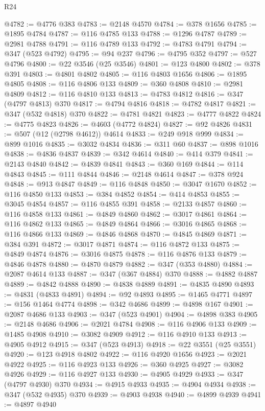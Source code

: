 \begin{lexlean}{R24}
\begin{coremodule}
@4782 := @4776 @383
@4783 := @2148 @4570
@4784 := @378 @1656
@4785 := @1895 @4784
@4787 := @116 @4785 @133
@4788 := @1296 @4787
@4789 := @2981 @4788
@4791 := @116 @4789 @133
@4792 := @4783 @4791
@4794 := @347 (@523 @4792)
@4795 := @94 @237
@4796 := @4795 @352
@4797 := @527 @4796
@4800 := @22 @3546 (@25 @3546)
@4801 := @123 @4800
@4802 := @378 @391
@4803 := @4801 @4802
@4805 := @116 @4803 @1656
@4806 := @1895 @4805
@4808 := @116 @4806 @133
@4809 := @360 @4808
@4810 := @2981 @4809
@4812 := @116 @4810 @133
@4813 := @4783 @4812
@4816 := @347 (@4797 @4813) @370
@4817 := @4794 @4816
@4818 := @4782 @4817
@4821 := @347 (@532 @4818) @370
@4822 := @4781 @4821
@4823 := @4777 @4822
@4824 := @4775 @4823
@4826 := @4603 (@4772 @4824)
@4827 := @92 @4826
@4831 := @507 (@12 (@2798 @4612)) @4614
@4833 := @249 @918 @999
@4834 := @899 @1016
@4835 := @3032 @4834
@4836 := @311 @60
@4837 := @898 @1016
@4838 := @4836 @4837
@4839 := @342 @4614
@4840 := @414 @379
@4841 := @2143 @4840
@4842 := @4839 @4841
@4843 := @360 @169
@4844 := @114 @4843
@4845 := @111 @4844
@4846 := @2148 @4614
@4847 := @378 @924
@4848 := @913 @4847
@4849 := @116 @4848
@4850 := @3047 @1670
@4852 := @116 @4850 @133
@4853 := @384 @4852
@4854 := @414 @4853
@4855 := @3045 @4854
@4857 := @116 @4855 @391
@4858 := @2133 @4857
@4860 := @116 @4858 @133
@4861 := @4849 @4860
@4862 := @3017 @4861
@4864 := @116 @4862 @133
@4865 := @4849 @4864
@4866 := @3016 @4865
@4868 := @116 @4866 @133
@4869 := @4846 @4868
@4870 := @4845 @4869
@4871 := @384 @391
@4872 := @3017 @4871
@4874 := @116 @4872 @133
@4875 := @4849 @4874
@4876 := @3016 @4875
@4878 := @116 @4876 @133
@4879 := @4846 @4878
@4880 := @4870 @4879
@4882 := @347 (@353 @4880)
@4884 := @2087 @4614 @133
@4887 := @347 (@367 @4884) @370
@4888 := @4882 @4887
@4889 := @4842 @4888
@4890 := @4838 @4889
@4891 := @4835 @4890
@4893 := @4831 (@4833 @4891)
@4894 := @92 @4893
@4895 := @1465 @4771
@4897 := @156 @1464 @4774
@4898 := @342 @4686
@4899 := @4898 @167
@4901 := @2087 @4686 @133
@4903 := @347 (@523 @4901)
@4904 := @4898 @383
@4905 := @2148 @4686
@4906 := @2021 @4784
@4908 := @116 @4906 @133
@4909 := @1485 @4908
@4910 := @3082 @4909
@4912 := @116 @4910 @133
@4913 := @4905 @4912
@4915 := @347 (@523 @4913)
@4918 := @22 @3551 (@25 @3551)
@4920 := @123 @4918 @4802
@4922 := @116 @4920 @1656
@4923 := @2021 @4922
@4925 := @116 @4923 @133
@4926 := @360 @4925
@4927 := @3082 @4926
@4929 := @116 @4927 @133
@4930 := @4905 @4929
@4933 := @347 (@4797 @4930) @370
@4934 := @4915 @4933
@4935 := @4904 @4934
@4938 := @347 (@532 @4935) @370
@4939 := @4903 @4938
@4940 := @4899 @4939
@4941 := @4897 @4940

\end{coremodule}
\end{lexlean}
